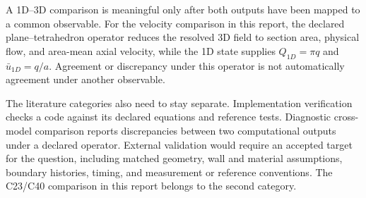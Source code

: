A 1D--3D comparison is meaningful only after both outputs have been mapped to a
common observable. For the velocity comparison in this report, the declared
plane--tetrahedron operator reduces the resolved 3D field to section area,
physical flow, and area-mean axial velocity, while the 1D state supplies
$Q_{1D}=\pi q$ and $\bar u_{1D}=q/a$. Agreement or discrepancy under this
operator is not automatically agreement under another observable.

The literature categories also need to stay separate. Implementation verification
checks a code against its declared equations and reference tests. Diagnostic
cross-model comparison reports discrepancies between two computational outputs
under a declared operator. External validation would require an accepted target
for the question, including matched geometry, wall and material assumptions,
boundary histories, timing, and measurement or reference conventions. The C23/C40
comparison in this report belongs to the second category.
